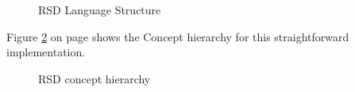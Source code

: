 \begin{figure}[h]
    \centering
    \caption{RSD Language Structure}
    \label{fig:RSDStructure}
\end{figure}

Figure \ref{fig:RSDDiagram} on page \pageref{fig:RSDDiagram} shows the Concept hierarchy for this straightforward implementation.

\begin{figure}[H]
    \centering
    \caption{RSD concept hierarchy}
    \label{fig:RSDDiagram}
\end{figure}

